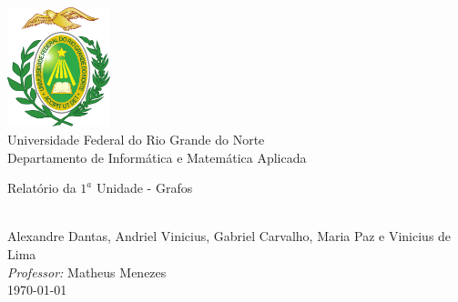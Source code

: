 \documentclass[a4paper,11pt,oneside]{book}
\begin{document}

\frontmatter

\begin{titlepage}
  \begin{center}
    \includegraphics[width=3cm]{figures/ufrnlogo.png}\\[0.5cm]
    {\LARGE Universidade Federal do Rio Grande do Norte\\[0.5cm]
    Departamento de Informática e Matemática Aplicada}\\[2cm]

    \linespread{1.2}\huge {
      Relatório da $1^a$ Unidade - Grafos

    }
    \linespread{1}~\\[2cm]
    {\Large
      Alexandre Dantas, Andriel Vinicius, Gabriel Carvalho, Maria Paz
      e Vinicius de Lima
    }\\[1cm]

    {\large \emph{Professor:} Matheus Menezes}\\[1cm]

    {\Large \today}
  \end{center}
\end{titlepage}


\tableofcontents
\listoffigures
\listoftables

\mainmatter
\end{document}
